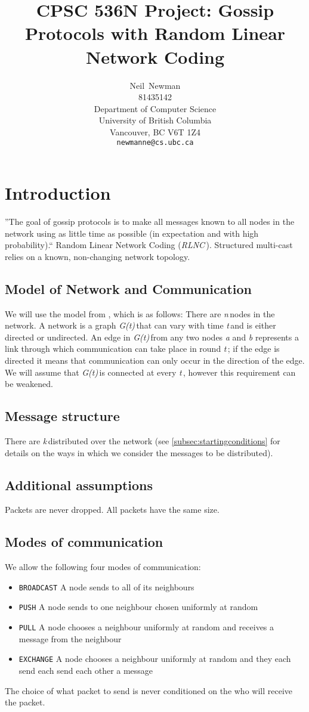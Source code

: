 \documentclass{article} %
\title{CPSC 536N Project: Gossip Protocols with Random Linear Network Coding}
\author{
Neil~Newman\\
81435142\\
Department of Computer Science\\
University of British Columbia\\
Vancouver, BC V6T 1Z4 \\
\texttt{newmanne@cs.ubc.ca}
}
\def\numNodes{\textit{n}\,}
\def\graph{\textit{G(t)}\,}
\def\graphtime{\textit{t}\,}
\def\numMessages{\textit{k}\,}
\def\RLNC{\textit{RLNC}\,}
\begin{document}
\maketitle

\section{Introduction}
''The goal of gossip protocols is to make all messages known to all nodes in the network using as little time as possible (in expectation and with high probability).`` Random Linear Network Coding (\RLNC). Structured multi-cast relies on a known, non-changing network topology. 

\subsection{Model of Network and Communication}
We will use the model from \cite{haeupler2011analyzing}, which is as follows: There are \numNodes nodes in the network. A network is a graph \graph that can vary with time \graphtime and is either directed or undirected. An edge in \graph from any two nodes \textit{a} and \textit{b} represents a link through which communication can take place in round \graphtime; if the edge is directed it means that communication can only occur in the direction of the edge. We will assume that \graph is connected at every \graphtime, however this requirement can be weakened. 

\subsection{Message structure}
There are \numMessages distributed over the network (see \ref{subsec:startingconditions} for details on the ways in which we consider the messages to be distributed). 

\subsection{Additional assumptions}
Packets are never dropped. All packets have the same size. 

\subsection{Modes of communication}
We allow the following four modes of communication:
\begin{itemize}
\item \texttt{BROADCAST} A node sends to all of its neighbours
\item \texttt{PUSH} A node sends to one neighbour chosen uniformly at random
\item \texttt{PULL} A node chooses a neighbour uniformly at random and receives a message from the neighbour
\item \texttt{EXCHANGE} A node chooses a neighbour uniformly at random and they each send each send each other a message
\end{itemize}
The choice of what packet to send is never conditioned on the who will receive the packet.
\end{document}
